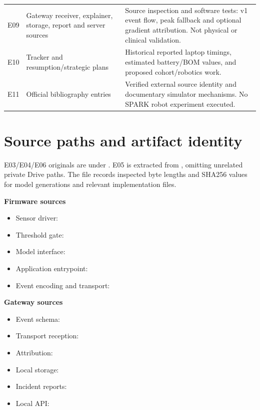 \begin{longtable}{@{}p{1cm}p{4.6cm}p{8.2cm}@{}}
E09 & Gateway receiver, explainer, storage, report and server sources & Source inspection and software tests: v1 event flow, peak fallback and optional gradient attribution. Not physical or clinical validation.\\
E10 & Tracker and resumption/strategic plans & Historical reported laptop timings, estimated battery/BOM values, and proposed cohort/robotics work.\\
E11 & Official bibliography entries & Verified external source identity and documentary simulator mechanisms. No SPARK robot experiment executed.\\\bottomrule
\end{longtable}

\section{Source paths and artifact identity}
E03/E04/E06 originals are under . E05 is extracted from , omitting unrelated private Drive paths. The  file records inspected byte lengths and SHA256 values for model generations and relevant implementation files.

\textbf{Firmware sources}
\begin{itemize}
\setlength{\itemsep}{0pt}\setlength{\parskip}{0pt}
\item Sensor driver: 
\item Threshold gate: 
\item Model interface: 
\item Application entrypoint: 
\item Event encoding and transport: 
\end{itemize}

\textbf{Gateway sources}
\begin{itemize}
\setlength{\itemsep}{0pt}\setlength{\parskip}{0pt}
\item Event schema: 
\item Transport reception: 
\item Attribution: 
\item Local storage: 
\item Incident reports: 
\item Local API: 
\end{itemize}

